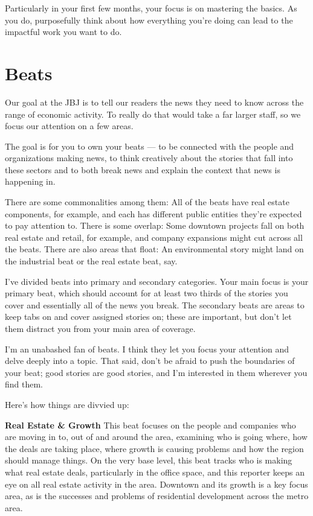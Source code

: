 \documentclass[
  12pt,
  american,
  letterpaperpaper,
  extrafontsizes,onecolumn,openright
  ]{memoir}
\begin{document}
Particularly in your first few months, your focus is on mastering the basics. As you do, purposefully think about how everything you're doing can lead to the impactful work you want to do.

\hypertarget{beats}{%
\chapter{Beats}\label{beats}}

Our goal at the JBJ is to tell our readers the news they need to know across the range of economic activity. To really do that would take a far larger staff, so we focus our attention on a few areas.

The goal is for you to own your beats --- to be connected with the people and organizations making news, to think creatively about the stories that fall into these sectors and to both break news and explain the context that news is happening in.

There are some commonalities among them: All of the beats have real estate components, for example, and each has different public entities they're expected to pay attention to. There is some overlap: Some downtown projects fall on both real estate and retail, for example, and company expansions might cut across all the beats. There are also areas that float: An environmental story might land on the industrial beat or the real estate beat, say.

I've divided beats into primary and secondary categories. Your main focus is your primary beat, which should account for at least two thirds of the stories you cover and essentially all of the news you break. The secondary beats are areas to keep tabs on and cover assigned stories on; these are important, but don't let them distract you from your main area of coverage.

I'm an unabashed fan of beats. I think they let you focus your attention and delve deeply into a topic. That said, don't be afraid to push the boundaries of your beat; good stories are good stories, and I'm interested in them wherever you find them.

Here's how things are divvied up:

\textbf{Real Estate \& Growth}
This beat focuses on the people and companies who are moving in to, out of and around the area, examining who is going where, how the deals are taking place, where growth is causing problems and how the region should manage things. On the very base level, this beat tracks who is making what real estate deals, particularly in the office space, and this reporter keeps an eye on all real estate activity in the area. Downtown and its growth is a key focus area, as is the successes and problems of residential development across the metro area.
\end{document}

